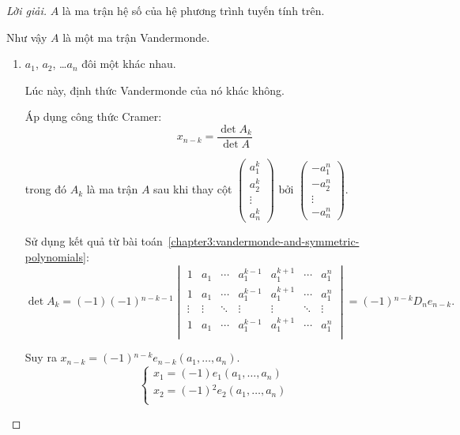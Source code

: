 \documentclass[class=linear-algebra,crop=false]{standalone}
\begin{document}
\begin{proof}[Lời giải]
	\par $A$ là ma trận hệ số của hệ phương trình tuyến tính trên.
	\par Như vậy $A$ là một ma trận Vandermonde.

	\begin{enumerate}[label = \textbf{Trường hợp \arabic*.},itemindent=2cm]
		\item $a_{1}$, $a_{2}$, \ldots $a_{n}$ đôi một khác nhau.
		      \par Lúc này, định thức Vandermonde của nó khác không.
		      \par Áp dụng công thức Cramer:
		      \[
			      x_{n-k} = \dfrac{\det A_{k}}{\det A}
		      \]
		      \par trong đó $A_{k}$ là ma trận $A$ sau khi thay cột $\begin{pmatrix} a_{1}^{k} \\ a_{2}^{k} \\ \vdots \\ a_{n}^{k} \end{pmatrix}$ bởi $\begin{pmatrix}-a_{1}^{n} \\ -a_{2}^{n} \\ \vdots \\ -a_{n}^{n} \end{pmatrix}$.
		      \par Sử dụng kết quả từ bài toán~\ref{chapter3:vandermonde-and-symmetric-polynomials}:
		      \[
			      \det A_{k} = (-1)(-1){}^{n-k-1}
			      \begin{vmatrix}
				      1      & a_{1}  & \cdots & a_{1}^{k-1} & a_{1}^{k+1} & \cdots & a_{1}^{n} \\
				      1      & a_{1}  & \cdots & a_{1}^{k-1} & a_{1}^{k+1} & \cdots & a_{1}^{n} \\
				      \vdots & \vdots & \ddots & \vdots      & \vdots      & \ddots & \vdots    \\
				      1      & a_{1}  & \cdots & a_{1}^{k-1} & a_{1}^{k+1} & \cdots & a_{1}^{n} \\
			      \end{vmatrix}
			      = (-1){}^{n-k}D_{n}e_{n-k}.
		      \]
		      \par Suy ra $x_{n-k} = (-1){}^{n-k}e_{n-k}(a_{1},\ldots, a_{n})$.
		      \[
			      \begin{cases}
				      x_{1} = (-1)e_{1}(a_{1},\ldots,a_{n})       \\
				      x_{2} = (-1){}^{2}e_{2}(a_{1},\ldots,a_{n}) \\

\end{cases}\]
\end{enumerate}
\end{proof}
\end{document}
